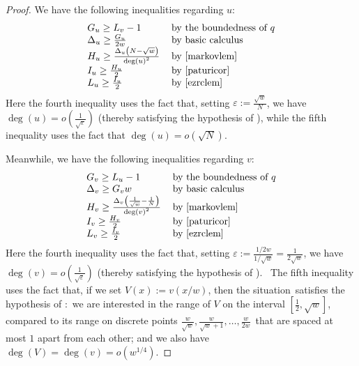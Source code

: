 \begin{proof}
We have the following inequalities regarding $u$:
\begin{equation}
\begin{tabular}
[c]{ll}
$G_{u}\geq L_{v}-1$ & by the boundedness of $q$\\
$\Delta_{u}\geq\frac{G_{u}}{2w}$ & by basic calculus\\
$H_{u}\geq\frac{\Delta_{u}\left(  N-\sqrt{w}\right)  }{\deg\left(  u\right)
^{2}}$ & by \Cref{markovlem}\\
$I_{u}\geq\frac{H_{u}}{2}$ & by \Cref{paturicor}\\
$L_{u}\geq\frac{I_{u}}{2}$ & by \Cref{ezrclem}
\end{tabular}
\end{equation}
Here the fourth inequality uses the fact that, setting $\varepsilon
:=\frac{\sqrt{w}}{N}$, we have $\deg\left(  u\right)  =o\left(  \frac{1}
{\sqrt{\varepsilon}}\right)  $ (thereby satisfying the hypothesis of ), while the fifth inequality uses the fact that $\deg\left(
u\right)  =o\left(  \sqrt{N}\right)  $.

Meanwhile, we have the following inequalities regarding $v$:
\begin{equation}
\begin{tabular}
[c]{ll}
$G_{v}\geq L_{u}-1$ & by the boundedness of $q$\\
$\Delta_{v}\geq G_{v}w$ & by basic calculus\\
$H_{v}\geq\frac{\Delta_{v}\left(  \frac{1}{\sqrt{w}}-\frac{1}{N}\right)
}{\deg\left(  v\right)  ^{2}}$ & by \Cref{markovlem}\\
$I_{v}\geq\frac{H_{v}}{2}$ & by \Cref{paturicor}\\
$L_{v}\geq\frac{I_{v}}{2}$ & by \Cref{ezrclem}
\end{tabular}
\end{equation}
Here the fourth inequality uses the fact that, setting $\varepsilon
:=\frac{1/2w}{1/\sqrt{w}}=\frac{1}{2\sqrt{w}}$, we have $\deg\left(  v\right)
=o\left(  \frac{1}{\sqrt{\varepsilon}}\right)  $ (thereby satisfying the
hypothesis of ). \ The fifth inequality uses the fact
that, if we set $V\left(  x\right)  :=v\left(  x/w\right)  $, then the
situation\ satisfies the hypothesis of :\ we are interested
in the range of $V$ on the interval $\left[  \frac{1}{2},\sqrt{w}\right]  $,
compared to its range on discrete points $\frac{w}{\sqrt{w}},\frac{w}{\sqrt
{w}+1},\ldots,\frac{w}{2w}$\ that are spaced at most $1$ apart from each
other; and we also have $\deg\left(  V\right)  =\deg\left(  v\right)
=o\left(  w^{1/4}\right)  $.


\end{proof}
